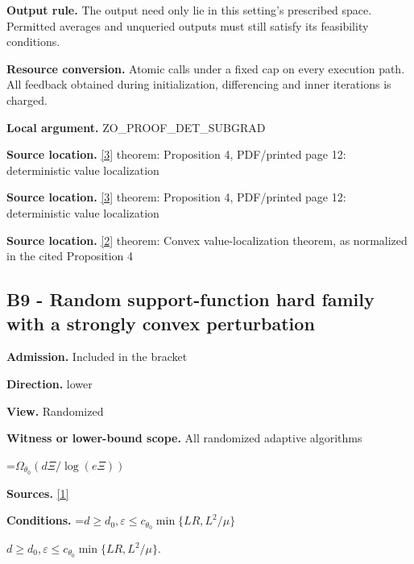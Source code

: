 \documentclass[10pt,a4paper]{article}
\newcommand{\AtlasMath}[1]{\par\begingroup\centering\setbox0=\hbox{$\displaystyle #1$}\ifdim\wd0>1.4\linewidth\typeout{ATLAS WIDE FORMULA: \the\wd0}\fi\ifdim\wd0>\linewidth\resizebox{\linewidth}{!}{\box0}\else\box0\fi\par\endgroup}
\newcommand{\AtlasInlineMath}[1]{\begingroup\setbox0=\hbox{$#1$}\ifdim\wd0>.4\linewidth\endgroup\AtlasMath{#1}\else\endgroup$#1$\fi}
\begin{document}
\textbf{Output rule.} The output need only lie in this setting's prescribed space. Permitted averages and unqueried outputs must still satisfy its feasibility conditions.



\textbf{Resource conversion.} Atomic calls under a fixed cap on every execution path. All feedback obtained during initialization, differencing and inner iterations is charged.



\textbf{Local argument.} ZO\_PROOF\_DET\_SUBGRAD



\textbf{Source location.} \href{https://arxiv.org/html/2607.16558v2}{[3]} theorem: Proposition 4, PDF/printed page 12: deterministic value localization



\textbf{Source location.} \href{https://arxiv.org/html/2607.16558v2}{[3]} theorem: Proposition 4, PDF/printed page 12: deterministic value localization



\textbf{Source location.} \href{https://www.mathnet.ru/php/archive.phtml?jrnid=mzm&option_lang=eng&paperid=1697&wshow=paper}{[2]} theorem: Convex value-localization theorem, as normalized in the cited Proposition 4



\subsection{B9 - Random support-function hard family with a strongly convex perturbation}


\textbf{Admission.} Included in the bracket



\textbf{Direction.} lower



\textbf{View.} Randomized



\textbf{Witness or lower-bound scope.} All randomized adaptive algorithms



\AtlasMath{\Omega_{\theta_0}(d\Xi/\log(e\Xi))}


\textbf{Sources.} \href{https://arxiv.org/html/2610.00345v1}{[1]}



\textbf{Conditions.} \AtlasInlineMath{d\ge d_0,\varepsilon\le c_{\theta_0}\min\{LR,L^2/\mu\}}.
\end{document}
